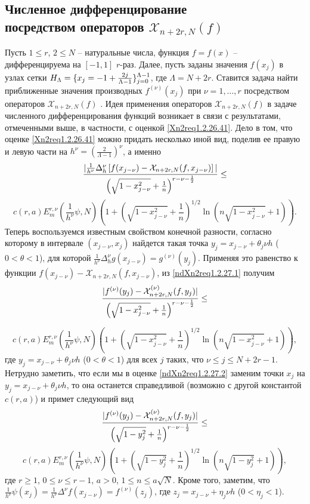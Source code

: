 \subsection{Численное дифференцирование\\ посредством операторов $\mathcal{X}_{n+2r,N}(f)$ }
Пусть $1\le r$, $2\le N$ -- натуральные числа, функция $f=f(x)$ -- дифференцируема на $[-1,1]$ $r$-раз. Далее, пусть заданы значения $f(x_j)$  в узлах сетки  $H_\Lambda=\{x_j=-1+{2j\over\Lambda-1}\}_{j=0}^{\Lambda-1}$,  где $\Lambda=N+2r$. Ставится задача найти приближенные значения производных $f^{(\nu)}(x_j)$ при $\nu=1,\ldots, r$ посредством операторов  $\mathcal{X}_{n+2r,N}(f)$ . Идея применения операторов
$\mathcal{X}_{n+2r,N}(f)$  в задаче численного дифференцирования функций возникает в связи с результатами, отмеченными выше, в частности, с     оценкой \eqref{Xn2req1.2.26.41}. Дело в том, что оценке \eqref{Xn2req1.2.26.41} можно придать несколько иной вид, поделив ее правую и левую  части на $h^\nu=(\frac{2}{\Lambda-1})^\nu$, а именно
$$
{|\frac1{h^{\nu}}\Delta_h^\nu\left[ f(x_{j-\nu})-\mathcal{X}_{n+2r,N}(f,x_{j-\nu})\right]|\over\left(\sqrt{1-x_{j-\nu}^2}+{1\over
n}\right)^{r-\nu-\frac12}}\le
$$
\begin{equation}\label{ndXn2req1.2.27.1}
c(r,a)E_m^{r,\nu}(\frac1{h^\nu}\psi,N)\left(1+\left(\sqrt{1-x_{j-\nu}^2}+\frac1n\right)^{1/2}\ln\left(n\sqrt{1-x_{j-\nu}^2}+1\right)\right).
\end{equation}
Теперь воспользуемся известным свойством конечной разности, согласно которому в интервале $(x_{j-\nu},x_j)$ найдется такая точка $y_j=x_{j-\nu}+ \theta_j \nu h$ ($0<\theta<1$), для которой $\frac1{h^\nu}\Delta_h^\nu g(x_{j-\nu})= g^{(\nu)}(y_j)$. Применяя это равенство к функции $f(x_{j-\nu})-\mathcal{X}_{n+2r,N}(f,x_{j-\nu})$, из \eqref{ndXn2req1.2.27.1}  получим
$$
{| f^{(\nu)}(y_j)-\mathcal{X}^{(\nu)}_{n+2r,N}(f,y_j)|\over\left(\sqrt{1-x_{j-\nu}^2}+{1\over
n}\right)^{r-\nu-\frac12}}\le
$$

\begin{equation}\label{ndXn2req1.2.27.2}
c(r,a)E_m^{r,\nu}(\frac1{h^\nu}\psi,N)\left(1+\left(\sqrt{1-x_{j-\nu}^2}+\frac1n\right)^{1/2}\ln\left(n\sqrt{1-x_{j-\nu}^2}+1\right)\right),
\end{equation}
где $y_j=x_{j-\nu}+ \theta_j \nu h$ ($0<\theta<1$) для всех $j$ таких, что $\nu\le j \le N+2r-1$. Нетрудно заметить, что если мы в оценке \eqref{ndXn2req1.2.27.2} заменим точки  $x_j$ на $y_j=x_{j-\nu}+ \theta_j \nu h$, то она останется справедливой (возможно с другой константой $c(r,a)$) и примет следующий вид
$$
{| f^{(\nu)}(y_j)-\mathcal{X}^{(\nu)}_{n+2r,N}(f,y_j)|\over\left(\sqrt{1-y_j^2}+{1\over n}\right)^{r-\nu-\frac12}}\le
$$
\begin{equation}\label{ndXn2req1.2.27.3}
c(r,a)E_m^{r,\nu}(\frac1{h^\nu}\psi,N)\left(1+\left(\sqrt{1-y_j^2}+\frac1n\right)^{1/2}\ln\left(n\sqrt{1-y_j^2}+1 \right)\right),
\end{equation}
где $r\ge 1$, $0\le \nu\le r-1$, $a>0$, $1\le n\le a\sqrt{N}$. Кроме того, заметим, что $\frac1{h^\nu}\psi(x_{j})=\frac1{h^\nu}\Delta^\nu f(x_{j-\nu})=f^{(\nu)}(z_j)$, где $z_j=x_{j-\nu}+\eta_j\nu h$ ($0<\eta_j<1$).

